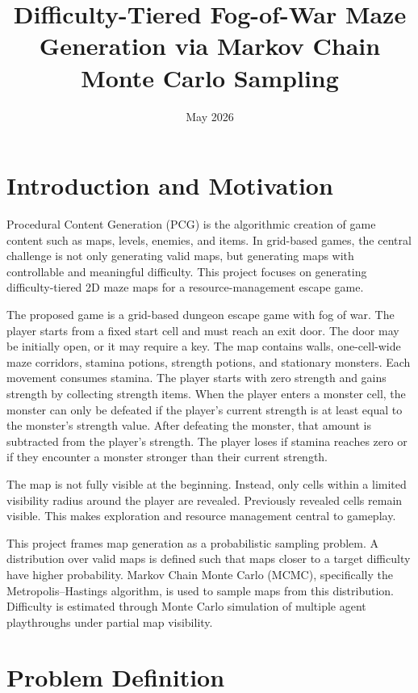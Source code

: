 \documentclass[11pt]{article}
\title{Difficulty-Tiered Fog-of-War Maze Generation via Markov Chain Monte Carlo Sampling}
\author{}
\date{May 2026}
\begin{document}
\maketitle

\section{Introduction and Motivation}

Procedural Content Generation (PCG) is the algorithmic creation of game content such as maps, levels, enemies, and items. In grid-based games, the central challenge is not only generating valid maps, but generating maps with controllable and meaningful difficulty. This project focuses on generating difficulty-tiered 2D maze maps for a resource-management escape game.

The proposed game is a grid-based dungeon escape game with fog of war. The player starts from a fixed start cell and must reach an exit door. The door may be initially open, or it may require a key. The map contains walls, one-cell-wide maze corridors, stamina potions, strength potions, and stationary monsters. Each movement consumes stamina. The player starts with zero strength and gains strength by collecting strength items. When the player enters a monster cell, the monster can only be defeated if the player's current strength is at least equal to the monster's strength value. After defeating the monster, that amount is subtracted from the player's strength. The player loses if stamina reaches zero or if they encounter a monster stronger than their current strength.

The map is not fully visible at the beginning. Instead, only cells within a limited visibility radius around the player are revealed. Previously revealed cells remain visible. This makes exploration and resource management central to gameplay.

This project frames map generation as a probabilistic sampling problem. A distribution over valid maps is defined such that maps closer to a target difficulty have higher probability. Markov Chain Monte Carlo (MCMC), specifically the Metropolis--Hastings algorithm, is used to sample maps from this distribution. Difficulty is estimated through Monte Carlo simulation of multiple agent playthroughs under partial map visibility.

\section{Problem Definition}
\end{document}
